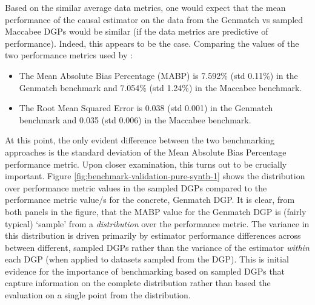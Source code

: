 \documentclass[../main.tex]{subfiles}
\begin{document}
Based on the similar average data metrics, one would expect that the mean performance of the causal estimator on the data from the Genmatch vs sampled Maccabee DGPs would be similar (if the data metrics are predictive of performance). Indeed, this appears to be the case. Comparing the values of the two performance metrics used by \citeauthor{Diamond2013GeneticStudies}:

\begin{itemize}
    \item The Mean Absolute Bias Percentage (MABP) is 7.592\% (std 0.11\%) in the Genmatch benchmark and 7.054\% (std 1.24\%) in the Maccabee benchmark.
    
    \item The Root Mean Squared Error is 0.038 (std 0.001) in the Genmatch benchmark and 0.035 (std 0.006) in the Maccabee benchmark.
\end{itemize}

At this point, the only evident difference between the two benchmarking approaches is the standard deviation of the Mean Absolute Bias Percentage performance metric. Upon closer examination, this turns out to be crucially important. Figure \ref{fig:benchmark-validation-pure-synth-1} shows the distribution over performance metric values in the sampled DGPs compared to the performance metric value/s for the concrete, Genmatch DGP. It is clear, from both panels in the figure, that the MABP value for the Genmatch DGP is (fairly typical) `sample' from a \textit{distribution} over the performance metric. The variance in this distribution is driven primarily by estimator performance differences across between different, sampled DGPs rather than the variance of the estimator \textit{within} each DGP (when applied to datasets sampled from the DGP). This is initial evidence for the importance of benchmarking based on sampled DGPs that capture information on the complete distribution rather than based the evaluation on a single point from the distribution.

\vspace{\baselineskip}
\end{document}
